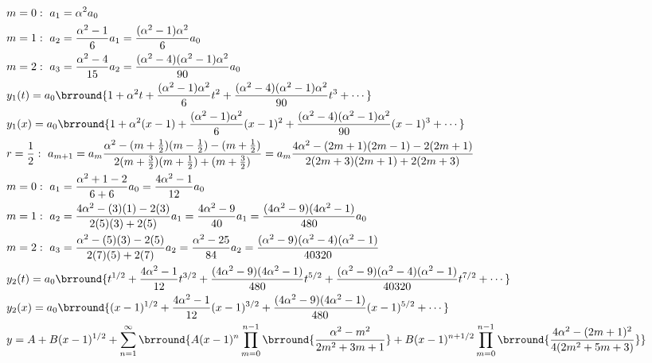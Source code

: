 \begin{small}
\begin{align*}
    &m=0:\ a_1=\alpha^2a_0\\
    &m=1:\ a_2=\frac{\alpha^2-1}{6}a_1=\frac{(\alpha^2-1)\alpha^2}{6}a_0\\
    &m=2:\ a_3=\frac{\alpha^2-4}{15}a_2=\frac{(\alpha^2-4)(\alpha^2-1)\alpha^2}{90}a_0\\
    &y_1(t)=a_0\brround{1+\alpha^2t+\frac{(\alpha^2-1)\alpha^2}{6}t^2+\frac{(\alpha^2-4)(\alpha^2-1)\alpha^2}{90}t^3+\cdots}\\
    &y_1(x)=a_0\brround{1+\alpha^2(x-1)+\frac{(\alpha^2-1)\alpha^2}{6}(x-1)^2+\frac{(\alpha^2-4)(\alpha^2-1)\alpha^2}{90}(x-1)^3+\cdots}\\
    &r=\frac{1}{2}:\ a_{m+1}=a_m\frac{\alpha^2-(m+\frac{1}{2})(m-\frac{1}{2})-(m+\frac{1}{2})}{2(m+\frac{3}{2})(m+\frac{1}{2})+(m+\frac{3}{2})}=a_m\frac{4\alpha^2-(2m+1)(2m-1)-2(2m+1)}{2(2m+3)(2m+1)+2(2m+3)}\\
    &m=0:\ a_1=\frac{\alpha^2+1-2}{6+6}a_0=\frac{4\alpha^2-1}{12}a_0\\
    &m=1:\ a_2=\frac{4\alpha^2-(3)(1)-2(3)}{2(5)(3)+2(5)}a_1=\frac{4\alpha^2-9}{40}a_1=\frac{(4\alpha^2-9)(4\alpha^2-1)}{480}a_0\\
    &m=2:\ a_3=\frac{\alpha^2-(5)(3)-2(5)}{2(7)(5)+2(7)}a_2=\frac{\alpha^2-25}{84}a_2=\frac{(\alpha^2-9)(\alpha^2-4)(\alpha^2-1)}{40320}\\
    &y_2(t)=a_0\brround{t^{1/2}+\frac{4\alpha^2-1}{12}t^{3/2}+\frac{(4\alpha^2-9)(4\alpha^2-1)}{480}t^{5/2}+\frac{(\alpha^2-9)(\alpha^2-4)(\alpha^2-1)}{40320}t^{7/2}+\cdots}\\
    &y_2(x)=a_0\brround{(x-1)^{1/2}+\frac{4\alpha^2-1}{12}(x-1)^{3/2}+\frac{(4\alpha^2-9)(4\alpha^2-1)}{480}(x-1)^{5/2}+\cdots}\\
    &y=A+B(x-1)^{1/2}+\sum_{n=1}^\infty\brround{A(x-1)^n\prod_{m=0}^{n-1}\brround{\frac{\alpha^2-m^2}{2m^2+3m+1}}+B(x-1)^{n+1/2}\prod_{m=0}^{n-1}\brround{\frac{4\alpha^2-(2m+1)^2}{4(2m^2+5m+3)}}}
\end{align*}
\end{small}


















